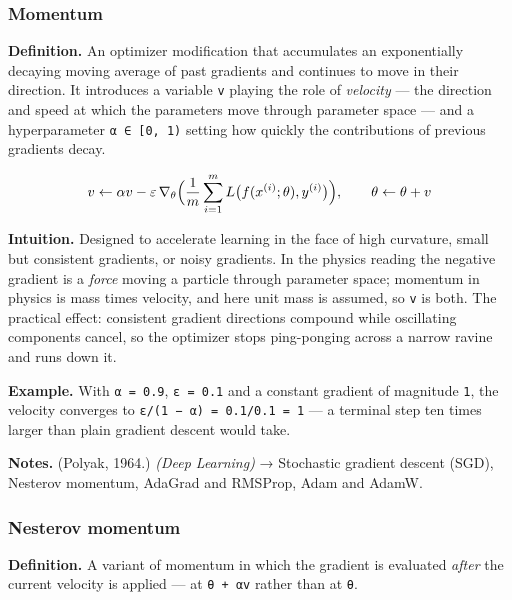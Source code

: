\documentclass[
  10pt,
  letterpaper,
  onecolumn]{article}
\begin{document}
\hypertarget{momentum}{%
\subsubsection{Momentum}\label{momentum}}

\textbf{Definition.} An optimizer modification that accumulates an
exponentially decaying moving average of past gradients and continues to
move in their direction. It introduces a variable \texttt{v} playing the
role of \emph{velocity} --- the direction and speed at which the
parameters move through parameter space --- and a hyperparameter
\texttt{α\ ∈\ {[}0,\ 1)} setting how quickly the contributions of
previous gradients decay.

\begin{equation*}
v\leftarrow\alpha v-\varepsilon\,\nabla_\theta\Bigl(\frac{1}{m}\sum_{i=1}^{m}L\bigl(f(x^{(i)};\theta),y^{(i)}\bigr)\Bigr),
\qquad
\theta\leftarrow\theta+v
\end{equation*}

\textbf{Intuition.} Designed to accelerate learning in the face of high
curvature, small but consistent gradients, or noisy gradients. In the
physics reading the negative gradient is a \emph{force} moving a
particle through parameter space; momentum in physics is mass times
velocity, and here unit mass is assumed, so \texttt{v} is both. The
practical effect: consistent gradient directions compound while
oscillating components cancel, so the optimizer stops ping-ponging
across a narrow ravine and runs down it.

\textbf{Example.} With \texttt{α\ =\ 0.9},
\texttt{ε\ =\ 0.1} and a constant gradient of magnitude \texttt{1}, the
velocity converges to
\texttt{ε/(1\ −\ α)\ =\ 0.1/0.1\ =\ 1} --- a terminal step ten times
larger than plain gradient descent would take.

\textbf{Notes.} (Polyak, 1964.) \emph{(Deep Learning)} → Stochastic
gradient descent (SGD), Nesterov momentum, AdaGrad and RMSProp, Adam and
AdamW.

\hypertarget{nesterov-momentum}{%
\subsubsection{Nesterov momentum}\label{nesterov-momentum}}

\textbf{Definition.} A variant of momentum in which the gradient is
evaluated \emph{after} the current velocity is applied --- at
\texttt{θ\ +\ αv} rather than at \texttt{θ}.
\end{document}
